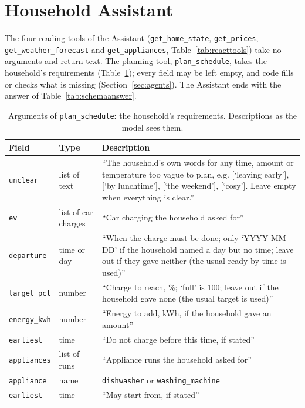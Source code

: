 \documentclass[12pt,a4paper]{report}
\begin{document}
\section{Household Assistant}

The four reading tools of the Assistant (\texttt{get\_home\_state}, \texttt{get\_prices},
\texttt{get\_weather\_\allowbreak forecast} and \texttt{get\_appliances},
Table~\ref{tab:reacttools}) take no
arguments and return text. The planning tool, \texttt{plan\_schedule},
takes the household's requirements (Table~\ref{tab:schemareq}); every
field may be left empty, and code fills or checks what is missing
(Section~\ref{sec:agents}). The Assistant ends with the answer of
Table~\ref{tab:schemaanswer}.

\begin{table}[htbp]
\caption{Arguments of \texttt{plan\_schedule}: the household's
requirements. Descriptions as the model sees them.}
\label{tab:schemareq}
\small
\begin{tabularx}{\textwidth}{@{}>{\raggedright\arraybackslash}p{3.3cm}>{\raggedright\arraybackslash}p{2.4cm}X@{}}
\toprule
Field & Type & Description \\
\midrule
\texttt{unclear} & list of text & ``The household's own words for any time, amount or temperature too vague to plan, e.g. [`leaving early'], [`by lunchtime'], [`the weekend'], [`cosy']. Leave empty when everything is clear.'' \\
\texttt{ev} & list of car charges & ``Car charging the household asked for'' \\
\quad\texttt{departure} & time or day & ``When the charge must be done; only `YYYY-MM-DD' if the household named a day but no time; leave out if they gave neither (the usual ready-by time is used)'' \\
\quad\texttt{target\_pct} & number & ``Charge to reach, \%; `full' is 100; leave out if the household gave none (the usual target is used)'' \\
\quad\texttt{energy\_kwh} & number & ``Energy to add, kWh, if the household gave an amount'' \\
\quad\texttt{earliest} & time & ``Do not charge before this time, if stated'' \\
\texttt{appliances} & list of runs & ``Appliance runs the household asked for'' \\
\quad\texttt{appliance} & name & \texttt{dishwasher} or \texttt{washing\_machine} \\
\quad\texttt{earliest} & time & ``May start from, if stated'' \\

\end{tabularx}
\end{table}
\end{document}
